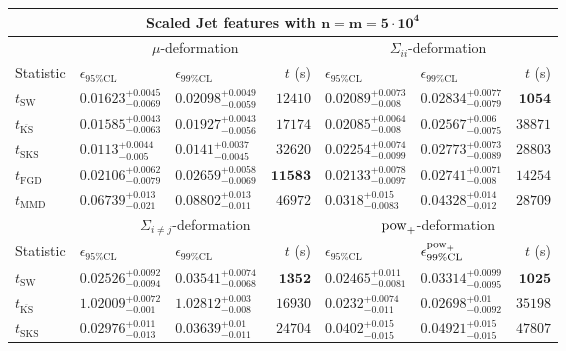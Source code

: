 \begin{tabular}{l|llr|llr}
	\toprule
	\multicolumn{7}{c}{{\bf Scaled Jet features with $\mathbf{n=m=5\cdot 10^{4}}$}} \\
	\toprule
	\multicolumn{1}{c}{} & \multicolumn{3}{c}{$\mu$-deformation} & \multicolumn{3}{c}{$\Sigma_{ii}$-deformation} \\
	Statistic & $\epsilon_{95\%\mathrm{CL}}$ & $\epsilon_{99\%\mathrm    {CL}}$ & $t$ (s) & $\epsilon_{95\%\mathrm{CL}}$ & $\epsilon_{99\%\mathrm{CL}}$ & $t$ (s) \\
	\midrule
	$t_{\mathrm{SW}}$ & $0.01623_{-0.0069}^{+0.0045}$ & $0.02098_{-0.0059}^{+0.0049}$ & $12410$ & $0.02089_{-0.008}^{+0.0073}$ & $0.02834_{-0.0079}^{+0.0077}$ & ${\mathbf{1054}}$ \\
	$t_{\overline{\mathrm{KS}}}$ & $0.01585_{-0.0063}^{+0.0043}$ & $0.01927_{-0.0056}^{+0.0043}$ & $17174$ & ${\mathbf{0.02085_{-0.008}^{+0.0064}}}$ & ${\mathbf{0.02567_{-0.0075}^{+0.006}}}$ & $38871$ \\
	$t_{\mathrm{SKS}}$ & ${\mathbf{0.0113_{-0.005}^{+0.0044}}}$ & ${\mathbf{0.0141_{-0.0045}^{+0.0037}}}$ & $32620$ & $0.02254_{-0.0099}^{+0.0074}$ & $0.02773_{-0.0089}^{+0.0073}$ & $28803$ \\
	$t_{\mathrm{FGD}}$ & $0.02106_{-0.0079}^{+0.0062}$ & $0.02659_{-0.0069}^{+0.0058}$ & ${\mathbf{11583}}$ & $0.02133_{-0.0097}^{+0.0078}$ & $0.02741_{-0.008}^{+0.0071}$ & $14254$ \\
	$t_{\mathrm{MMD}}$ & $0.06739_{-0.021}^{+0.013}$ & $0.08802_{-0.011}^{+0.013}$ & $46972$ & $0.0318_{-0.0083}^{+0.015}$ & $0.04328_{-0.012}^{+0.014}$ & $28709$ \\
	\toprule
	\multicolumn{1}{c}{} & \multicolumn{3}{c}{$\Sigma_{i\neq j}$-deformation} & \multicolumn{3}{c}{$\rm{pow}_{+}$-deformation} \\
	Statistic & $\epsilon_{95\%\mathrm{CL}}$ & $\epsilon_{99\%\mathrm{CL}}$ & $t$ (s) & $\epsilon_{95\%\mathrm{CL}}$ & $\epsilon^{\rm   {pow}_{+}}_{99\%\mathrm{CL}}$ & $t$ (s) \\
	\midrule
	$t_{\mathrm{SW}}$ & $0.02526_{-0.0094}^{+0.0092}$ & $0.03541_{-0.0068}^{+0.0074}$ & ${\mathbf{1352}}$ & $0.02465_{-0.0081}^{+0.011}$ & $0.03314_{-0.0095}^{+0.0099}$ & ${\mathbf{1025}}$ \\
	$t_{\overline{\mathrm{KS}}}$ & $1.02009_{-0.001}^{+0.0072}$ & $1.02812_{-0.008}^{+0.003}$ & $16930$ & $0.0232_{-0.011}^{+0.0074}$ & $0.02698_{-0.0092}^{+0.01}$ & $35198$ \\
	$t_{\mathrm{SKS}}$ & $0.02976_{-0.013}^{+0.011}$ & $0.03639_{-0.011}^{+0.01}$ & $24704$ & $0.0402_{-0.015}^{+0.015}$ & $0.04921_{-0.015}^{+0.015}$ & $47807$ \\

\end{tabular}
